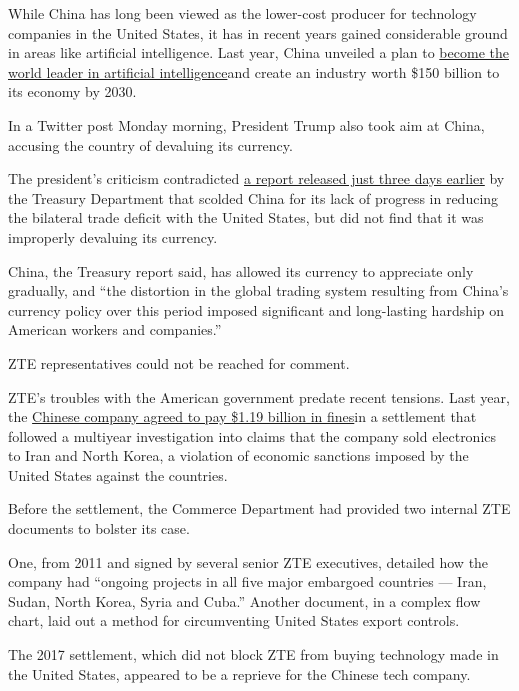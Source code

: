 While China has long been viewed as the lower-cost producer for
technology companies in the United States, it has in recent years gained
considerable ground in areas like artificial intelligence. Last year,
China unveiled a plan to
\href{https://www.nytimes.com/2018/02/12/technology/china-trump-artificial-intelligence.html}{become
the world leader in artificial intelligence}and create an industry worth
\$150 billion to its economy by 2030.

In a Twitter post Monday morning, President Trump also took aim at
China, accusing the country of devaluing its currency.

The president's criticism contradicted
\href{https://www.nytimes.com/2018/04/13/us/politics/trump-china-currency-manipulator.html}{a
report released just three days earlier} by the Treasury Department that
scolded China for its lack of progress in reducing the bilateral trade
deficit with the United States, but did not find that it was improperly
devaluing its currency.

China, the Treasury report said, has allowed its currency to appreciate
only gradually, and ``the distortion in the global trading system
resulting from China's currency policy over this period imposed
significant and long-lasting hardship on American workers and
companies.''

ZTE representatives could not be reached for comment.

ZTE's troubles with the American government predate recent tensions.
Last year, the
\href{https://www.nytimes.com/2017/03/07/technology/zte-china-fine.html}{Chinese
company agreed to pay \$1.19 billion in fines}in a settlement that
followed a multiyear investigation into claims that the company sold
electronics to Iran and North Korea, a violation of economic sanctions
imposed by the United States against the countries.

Before the settlement, the Commerce Department had provided two internal
ZTE documents to bolster its case.

One, from 2011 and signed by several senior ZTE executives, detailed how
the company had ``ongoing projects in all five major embargoed countries
--- Iran, Sudan, North Korea, Syria and Cuba.'' Another document, in a
complex flow chart, laid out a method for circumventing United States
export controls.

The 2017 settlement, which did not block ZTE from buying technology made
in the United States, appeared to be a reprieve for the Chinese tech
company.

